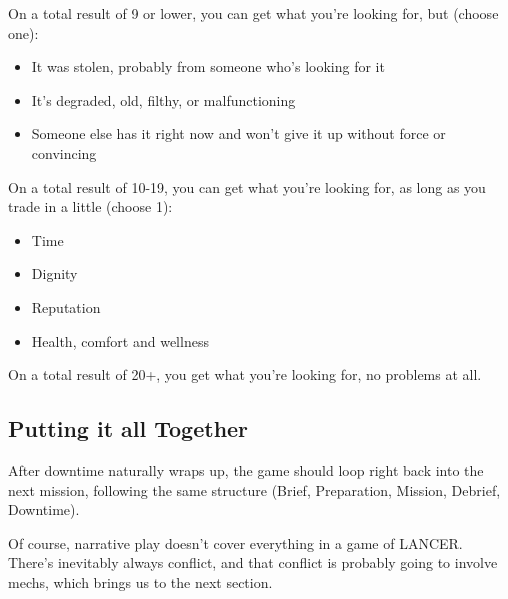 On a total result of 9 or lower, you can get what you’re looking for, but (choose one):
\begin{itemize}
\item It was stolen, probably from someone who’s looking for it
\item It’s degraded, old, filthy, or malfunctioning
\item Someone else has it right now and won’t give it up without force or convincing
\end{itemize}  
On a total result of 10-19, you can get what you’re looking for, as long as you trade in a little (choose 1):
\begin{itemize}
\item Time
\item Dignity
\item Reputation
\item Health, comfort and wellness
\end{itemize}  
On a total result of 20+, you get what you’re looking for, no problems at all.

\subsection{Putting it all Together}

After downtime naturally wraps up, the game should loop right back into the next mission, following the same structure (Brief, Preparation, Mission, Debrief, Downtime).

Of course, narrative play doesn’t cover everything in a game of LANCER. There’s inevitably always conflict, and that conflict is probably going to involve mechs, which brings us to the next section.
